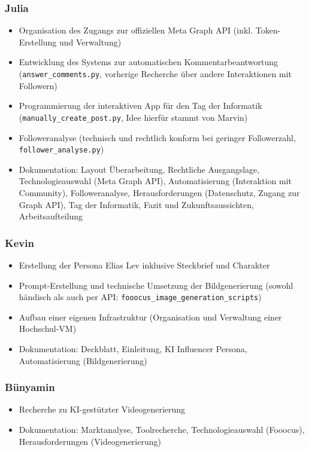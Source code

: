 \documentclass[a4paper,12pt]{article}
\begin{document}
\subsubsection*{Julia}

\begin{itemize}
    \item Organisation des Zugangs zur offiziellen Meta Graph API (inkl. Token-Erstellung und Verwaltung)
    \item Entwicklung des Systems zur automatischen Kommentarbeantwortung (\texttt{answer\_comments.py}, vorherige Recherche über andere Interaktionen mit Followern)
    \item Programmierung der interaktiven App für den Tag der Informatik (\texttt{manually\_create\_post.py}, Idee hierfür stammt von Marvin)
    \item Followeranalyse (technisch und rechtlich konform bei geringer Followerzahl, \texttt{follower\_analyse.py})
    \item Dokumentation: Layout Überarbeitung, Rechtliche Ausgangslage, Technologieauswahl (Meta Graph API), Automatisierung (Interaktion mit Community), Followeranalyse, Herausforderungen (Datenschutz, Zugang zur Graph API), Tag der Informatik, Fazit und Zukunftsaussichten, Arbeitsaufteilung
\end{itemize}

\subsubsection*{Kevin}

\begin{itemize}
    \item Erstellung der Persona Elias Lev inklusive Steckbrief und Charakter
    \item Prompt-Erstellung und technische Umsetzung der Bildgenerierung (sowohl händisch als auch per API: \texttt{fooocus\_image\_generation\_scripts})
    \item Aufbau einer eigenen Infrastruktur (Organisation und Verwaltung einer Hochschul-VM)
    \item Dokumentation: Deckblatt, Einleitung, KI Influencer Persona, Automatisierung (Bildgenerierung)
\end{itemize}

\subsubsection*{Bünyamin}

\begin{itemize}
    \item Recherche zu KI-gestützter Videogenerierung
    \item Dokumentation: Marktanalyse, Toolrecherche, Technologieauswahl (Fooocus), Herausforderungen (Videogenerierung)
\end{itemize}
\end{document}
